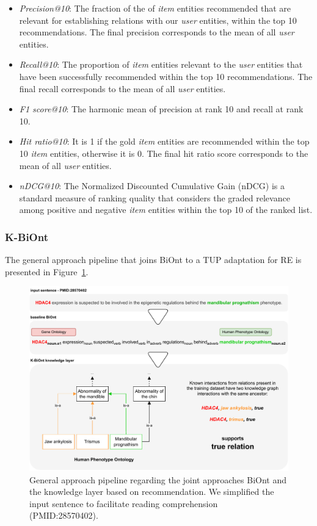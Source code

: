 \begin{itemize}
    \item \textit{Precision@10}: The fraction of the of \textit{item} entities recommended that are relevant for establishing relations with our \textit{user} entities, within the top 10 recommendations. The final precision corresponds to the mean of all \textit{user} entities. 
    \item \textit{Recall@10}: The proportion of \textit{item} entities relevant to the \textit{user} entities that have been successfully recommended within the top 10 recommendations. The final recall corresponds to the mean of all \textit{user} entities. 
    \item \textit{F1 score@10}: The harmonic mean of precision at rank 10 and recall at rank 10. 
    \item \textit{Hit ratio@10}: It is 1 if the gold \textit{item} entities are recommended within the top 10 \textit{item} entities, otherwise it is 0. The final hit ratio score corresponds to the mean of all \textit{user} entities.  
    \item \textit{nDCG@10}: The Normalized Discounted Cumulative Gain (nDCG) is a standard measure of ranking quality that considers the graded relevance among positive and negative \textit{item} entities within the top 10 of the ranked list. 
\end{itemize}

\subsubsection{K-BiOnt}

The general approach pipeline that joins BiOnt to a TUP adaptation for RE is presented in Figure~\ref{fig:full_pipeline}.

\begin{figure}[!h]
\centerline{\includegraphics[width=\linewidth]{images/chapter_4/pipeline.pdf}}
\caption[General K-BiOnt Approach Pipeline]{General approach pipeline regarding the joint approaches BiOnt and the knowledge layer based on recommendation. We simplified the input sentence to facilitate reading comprehension (PMID:28570402).}
\label{fig:full_pipeline}
\end{figure}

